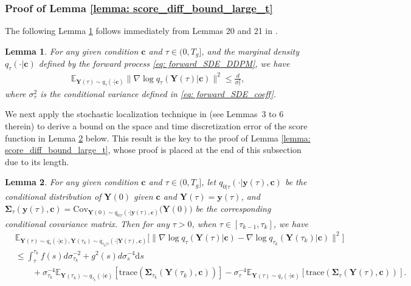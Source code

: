 \documentclass[11pt]{article}
\newtheorem{lemma}{Lemma}
\newcommand{\mE}{\mathbb{E}}
\newcommand{\bY}{\mathbf{Y}}
\newcommand{\by}{\mathbf{y}}
\newcommand{\bc}{\mathbf{c}}
\newcommand{\bSimga}{\boldsymbol{\Sigma}}
\newcommand{\cov}{{\text{Cov}}}
\newcommand{\intd}{\mathrm{d}}
\begin{document}
\subsubsection{Proof of Lemma \ref{lemma: score_diff_bound_large_t}}\label{sec: stochastic_local_score_diff_bound}

The following Lemma \ref{lemma: score_function_norm_bound} follows immediately from Lemmas 20 and 21 in \cite{chen2023improved}.


\begin{lemma}\label{lemma: score_function_norm_bound}
    For any given condition $\bc$ and $\tau \in (0, T_g]$, and the marginal density $q_\tau(\cdot | \bc)$ defined by the forward process \eqref{eq: forward_SDE_DDPM}, we have
    \begin{align*}
        \mE_{\bY(\tau)\sim q_\tau(\cdot | \bc)}\|\nabla\log q_\tau(\bY(\tau) | \bc)\|^2 \le \frac{d}{\sigma_\tau^2},
    \end{align*}
    where $\sigma_\tau^2$ is the conditional variance defined in \eqref{eq: forward_SDE_coeff}.
\end{lemma}















We next apply the stochastic localization technique in \cite{bentonnearly} (see Lemmas~3 to 6 therein) to derive a bound on the space and time discretization error of the score function in Lemma \ref{lemma: stochastic_char_score_diff} below. This result is the key to the proof of Lemma \ref{lemma: score_diff_bound_large_t}, whose proof is placed at the end of this subsection due to its length.



\begin{lemma}\label{lemma: stochastic_char_score_diff}
    For any given condition $\bc$ and $\tau \in (0, T_g]$, let $q_{0|\tau}(\cdot | \by(\tau), \bc)$ be the conditional distribution of $\bY(0)$ given $\bc$ and $\bY(\tau)=\by(\tau)$, and $\bSimga_\tau(\by(\tau), \bc) = \cov_{\bY(0)\sim q_{0|\tau}(\cdot | \by(\tau), \bc)}\big(\bY(0)\big)$ be the corresponding conditional covariance matrix. Then for any $\tau > 0$, when $\tau\in[\tau_{k - 1}, \tau_k]$, we have
    \begin{align*}
    &\mE_{\bY(\tau)\sim q_\tau(\cdot | \bc), \bY(\tau_k)\sim q_{\tau_k | \tau}(\cdot | \bY(\tau), \bc)}\big[\|\nabla\log q_{\tau}(\bY(\tau) | \bc) - \nabla\log q_{\tau_k}(\bY(\tau_k) | \bc ) \|^2\big]\\
    &\le \int_{\tau}^{\tau_k} f(s)d\sigma^{-2}_{\tau_k} + g^2(s)d\sigma^{-4}_{s} \intd s\\
    &\qquad + \sigma_{\tau_k}^{-4}\mE_{\bY(\tau_k)\sim q_{\tau_k}(\cdot | \bc)}[\text{trace}(\bSimga_{\tau_k}(\bY(\tau_k), \bc))] - \sigma_{\tau}^{-4}\mE_{\bY(\tau)\sim q_\tau(\cdot | \bc)}[\text{trace}(\bSimga_{\tau}(\bY(\tau), \bc))].
\end{align*}
\end{lemma}
\end{document}
